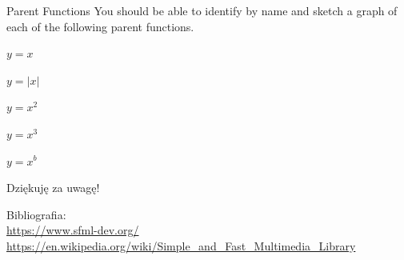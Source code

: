 \documentclass[12pt]{beamer}
\begin{document}



    



    \begin{frame}[t]{Parent Functions}\vspace{4pt}
        You should be able to identify by name and sketch a graph 
        of each of the following parent functions.
        \begin{enumerate}
            \begin{multicols}{3}
                \item $y=x$
                \item $y=|x|$
                \item $y=x^2$
                \item $y=x^3$
                \item $y=x^b$
            \end{multicols}
        \end{enumerate}

    \end{frame}



    \begin{frame}

        \flushleft
        \huge{Dziękuję za uwagę!}

        \vspace{90pt}

        \large{Bibliografia:} \\

        \textcolor{green}{
            \url{https://www.sfml-dev.org/} \\
            \url{https://en.wikipedia.org/wiki/Simple_and_Fast_Multimedia_Library} \\
        }
        

    \end{frame}
\end{document}
